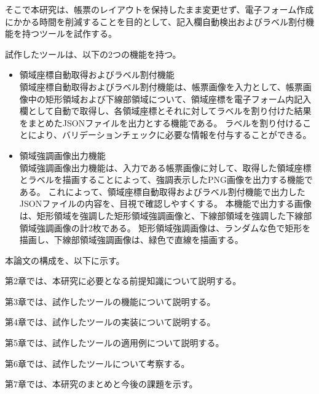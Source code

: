 そこで本研究は、帳票のレイアウトを保持したまま変更せず、電子フォーム作成にかかる時間を削減することを目的として、記入欄自動検出およびラベル割付機能を持つツールを試作する。


試作したツールは、以下の2つの機能を持つ。

\begin{itemize}
  \item 領域座標自動取得およびラベル割付機能\\
      領域座標自動取得およびラベル割付機能は、帳票画像を入力として、帳票画像中の矩形領域および下線部領域について、領域座標を電子フォーム内記入欄として自動で取得し、各領域座標とそれに対してラベルを割り付けた結果をまとめたJSONファイルを出力とする機能である。
      ラベルを割り付けることにより、バリデーションチェックに必要な情報を付与することができる。
  \item 領域強調画像出力機能\\
      領域強調画像出力機能は、入力である帳票画像に対して、取得した領域座標とラベルを描画することによって、強調表示したPNG画像を出力する機能である。
      これによって、領域座標自動取得およびラベル割付機能で出力したJSONファイルの内容を、目視で確認しやすくする。
      本機能で出力する画像は、矩形領域を強調した矩形領域強調画像と、下線部領域を強調した下線部領域強調画像の計2枚である。
      矩形領域強調画像は、ランダムな色で矩形を描画し、下線部領域強調画像は、緑色で直線を描画する。
\end{itemize}

本論文の構成を、以下に示す。\par
第2章では、本研究に必要となる前提知識について説明する。\par
第3章では、試作したツールの機能について説明する。\par
第4章では、試作したツールの実装について説明する。\par
第5章では、試作したツールの適用例について説明する。\par
第6章では、試作したツールについて考察する。\par
第7章では、本研究のまとめと今後の課題を示す。